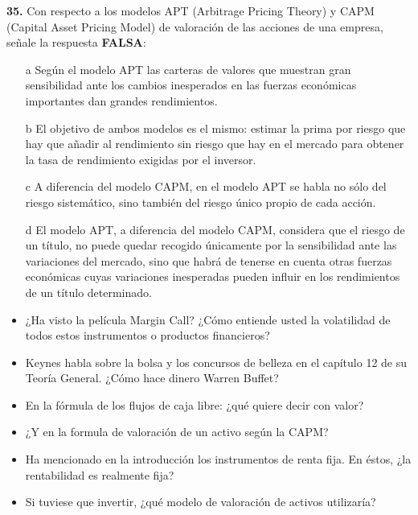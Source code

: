 \documentclass{nuevotema}
\begin{document}
\textbf{35.} Con respecto a los modelos APT (Arbitrage Pricing Theory) y CAPM (Capital Asset Pricing Model) de valoración de las acciones de una empresa, señale la respuesta \textbf{FALSA}:
\begin{enumerate}
	\item[a] Según el modelo APT las carteras de valores que muestran gran sensibilidad ante los cambios inesperados en las fuerzas económicas importantes dan grandes rendimientos.
	\item[b] El objetivo de ambos modelos es el mismo: estimar la prima por riesgo que hay que añadir al rendimiento sin riesgo que hay en el mercado para obtener la tasa de rendimiento exigidas por el inversor.
	\item[c] A diferencia del modelo CAPM, en el modelo APT se habla no sólo del riesgo sistemático, sino también del riesgo único propio de cada acción.
	\item[d] El modelo APT, a diferencia del modelo CAPM, considera que el riesgo de un título, no puede quedar recogido únicamente por la sensibilidad ante las variaciones del mercado, sino que habrá de tenerse en cuenta otras fuerzas económicas cuyas variaciones inesperadas pueden influir en los rendimientos de un título determinado.
\end{enumerate}

\begin{itemize}
    \item ¿Ha visto la película Margin Call? ¿Cómo entiende usted la volatilidad de todos estos instrumentos o productos financieros?
    \item Keynes habla sobre la bolsa y los concursos de belleza en el capítulo 12 de su Teoría General. ¿Cómo hace dinero Warren Buffet?
    \item En la fórmula de los flujos de caja libre: ¿qué quiere decir con valor?
    \item ¿Y en la formula de valoración de un activo según la CAPM? 
    \item Ha mencionado en la introducción los instrumentos de renta fija. En éstos, ¿la rentabilidad es realmente fija?
\end{itemize}

\begin{itemize}
    \item Si tuviese que invertir, ¿qué modelo de valoración de activos utilizaría?
\end{itemize}
\end{document}
